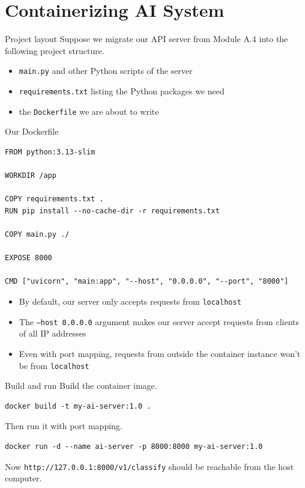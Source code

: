 \documentclass[aspectratio=169]{beamer}
\begin{document}
\section{Containerizing AI System}

\begin{frame}{Project layout}
  Suppose we migrate our API server from Module A.4 into the following project structure.
  \begin{itemize}
      \item \texttt{main.py} and other Python scripts of the server
      \item \texttt{requirements.txt} listing the Python packages we need
      \item the \texttt{Dockerfile} we are about to write
  \end{itemize}
\note{
}
\end{frame}


\begin{frame}[fragile]{Our Dockerfile}
    \begin{verbatim}
FROM python:3.13-slim

WORKDIR /app

COPY requirements.txt .
RUN pip install --no-cache-dir -r requirements.txt

COPY main.py ./

EXPOSE 8000

CMD ["uvicorn", "main:app", "--host", "0.0.0.0", "--port", "8000"]
    \end{verbatim}

    \begin{itemize}
      \item By default, our server only accepts requests from \texttt{localhost}
      \item The \texttt{--host 0.0.0.0} argument makes our server accept requests from clients of all IP addresses
      \item Even with port mapping, requests from outside the container instance won't be from \texttt{localhost}
    \end{itemize}
    
\note{
}
\end{frame}


\begin{frame}[fragile]{Build and run}
Build the container image.
    \begin{verbatim}
docker build -t my-ai-server:1.0 .
    \end{verbatim}

Then run it with port mapping.
    \begin{verbatim}
docker run -d --name ai-server -p 8000:8000 my-ai-server:1.0
    \end{verbatim}

Now \texttt{http://127.0.0.1:8000/v1/classify} should be reachable from the host computer.
\note{
}
\end{frame}
\end{document}
